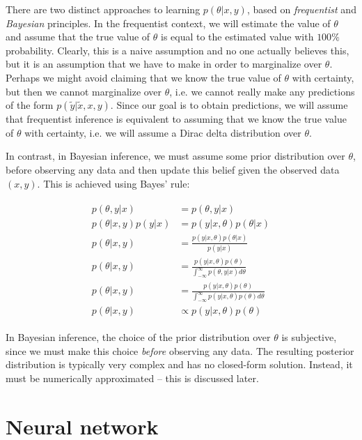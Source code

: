 \documentclass[12pt]{article}
\begin{document}
There are two distinct approaches to learning $p(\theta | x, y)$, based on \textit{frequentist} and \textit{Bayesian} principles. In the frequentist context, we will estimate the value of $\theta$ and assume that the true value of $\theta$ is equal to the estimated value with $100\%$ probability. Clearly, this is a naive assumption and no one actually believes this, but it is an assumption that we have to make in order to marginalize over $\theta$. Perhaps we might avoid claiming that we know the true value of $\theta$ with certainty, but then we cannot marginalize over $\theta$, i.e. we cannot really make any predictions of the form $p(\tilde{y} | \tilde{x}, x, y)$. Since our goal is to obtain predictions, we will assume that frequentist inference is equivalent to assuming that we know the true value of $\theta$ with certainty, i.e. we will assume a Dirac delta distribution over $\theta$.

In contrast, in Bayesian inference, we must assume some prior distribution over $\theta$, before observing any data and then update this belief given the observed data $(x, y)$. This is achieved using Bayes' rule:

\begin{align}
\begin{split}
p(\theta,y|x) &= p(\theta,y|x) \\
p(\theta|x,y)p(y|x) &= p(y|x,\theta)p(\theta|x)\\
p(\theta|x,y) &= \frac{p(y|x,\theta)p(\theta|x)}{p(y|x)}\\
p(\theta|x,y) &= \frac{p(y|x,\theta)p(\theta)}{\int_{-\infty}^\infty p(\theta, y|x) d\theta}\\
p(\theta|x,y) &= \frac{p(y|x,\theta)p(\theta)}{\int_{-\infty}^\infty p(y|x,\theta)p(\theta) d\theta}\\
p(\theta|x,y) &\propto p(y|x,\theta)p(\theta)
\end{split}
\label{eq_posterior}
\end{align}

In Bayesian inference, the choice of the prior distribution over $\theta$ is subjective, since we must make this choice \textit{before} observing any data. The resulting posterior distribution is typically very complex and has no closed-form solution. Instead, it must be numerically approximated -- this is discussed later.

\section{Neural network}
\end{document}
